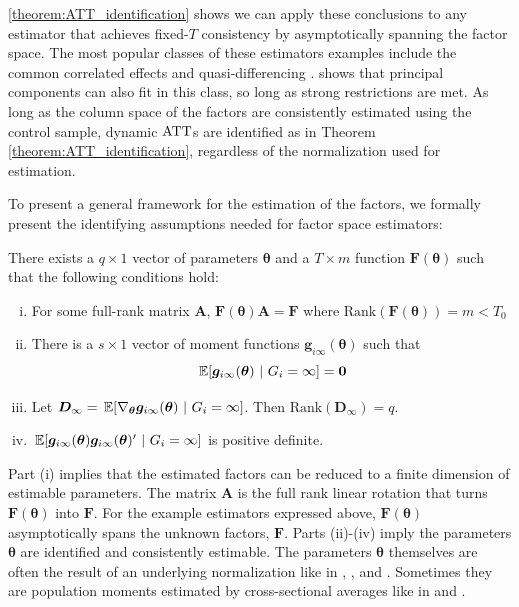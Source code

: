 \autoref{theorem:ATT_identification} shows we can apply these conclusions to any estimator that achieves fixed-$T$ consistency by asymptotically spanning the factor space. The most popular classes of these estimators examples include the common correlated effects \citep{pesaran2006estimation} and quasi-differencing \citep{Ahn_Lee_Schmidt_2013}. \citet{Westerlund_2020} shows that principal components can also fit in this class, so long as strong restrictions are met. As long as the column space of the factors are consistently estimated using the control sample, dynamic $\text{ATT}$s are identified as in Theorem \ref{theorem:ATT_identification}, regardless of the normalization used for estimation. 

To present a general framework for the estimation of the factors, we formally present the identifying assumptions needed for factor space estimators:
\begin{assumption}\label{asm:factor_identification}
  There exists a $q \times 1$ vector of parameters $\bm{\theta}$ and a $T \times m$ function $\bm{F}(\bm{\theta})$ such that the following conditions hold:
  \begin{enumerate}[(i)]
    \item For some full-rank matrix $\bm{A}$, $\bm{F}(\bm{\theta}) \bm{A} = \bm{F}$ where $\text{Rank}(\bm{F}(\bm{\theta})) = m < T_0$ 
    \item There is a $s \times 1$ vector of moment functions $\bm g_{i\infty}(\bm{\theta})$ such that 
    \begin{equation}\label{eq:factor_moments}
      \expec{\bm g_{i\infty}(\bm{\theta})}{G_i = \infty} = \bm 0
    \end{equation}
    
    \item Let $\bm D_{\infty} = \expec{\nabla_{\bm{\theta}} \bm g_{i \infty}(\bm{\theta})}{G_i = \infty}$. Then $\text{Rank}(\bm D_{\infty}) = q$.
    \item $\expec{\bm g_{i \infty}(\bm{\theta}) \bm g_{i \infty}(\bm{\theta})'}{G_i = \infty}$ is positive definite. 
  \end{enumerate}
\end{assumption}
Part (i) implies that the estimated factors can be reduced to a finite dimension of estimable parameters. The matrix $\bm A$ is the full rank linear rotation that turns $\bm{F}(\bm{\theta})$ into $\bm{F}$. For the example estimators expressed above, $\bm{F}(\bm{\theta})$ asymptotically spans the unknown factors, $\bm{F}$. Parts (ii)-(iv) imply the parameters $\bm{\theta}$ are identified and consistently estimable. The parameters $\bm{\theta}$ themselves are often the result of an underlying normalization like in \citet{Ahn_Lee_Schmidt_2001,Ahn_Lee_Schmidt_2013}, \citet{Juodis_Sarafidis_2022,Juodis_Sarafidis2021}, and \citet{Callaway_Karami_2020}. Sometimes they are population moments estimated by cross-sectional averages like in \citet{Westerlund_Petrova_Norkute_2019} and \citet{Brown_Schmidt_Wooldridge2021}. 

